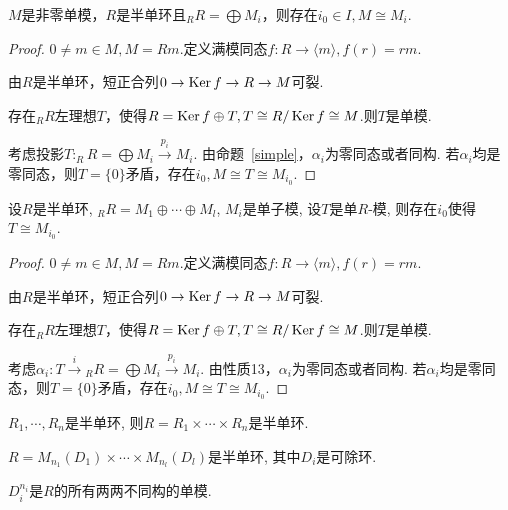 \begin{proposition}
    $M$是非零单模，$ R $是半单环且$_R R=\bigoplus M_i$，则存在$i_0\in I,M\cong M_i$.
\end{proposition}
\begin{proof}
$0\neq m\in M,M=Rm$.定义满模同态$f:R\rightarrow \langle m\rangle,f(r)=rm$.

由$ R $是半单环，短正合列$0\rightarrow \operatorname{Ker} f\rightarrow R\rightarrow M$可裂.

存在$_R R$左理想$T$，使得$R=\operatorname{Ker} f\oplus T,T\cong R/\operatorname{Ker} f\cong M $.则$T$是单模.

考虑投影$T: _RR=\bigoplus M_i \xrightarrow{p_i} M_i$.
由命题~\ref{simple}，$\alpha _i$为零同态或者同构.
若$\alpha _i$均是零同态，则$T=\{0\}$矛盾，存在$i_0,M\cong T\cong M_{i_0}$.
\end{proof}
\begin{corollary}
    设$R$是半单环, $_RR=M_1\oplus \cdots \oplus M_l$, $M_i$是单子模, 
    设$T$是单$R$-模, 则存在$i_0$使得$T\cong M_{i_0}$.
\end{corollary}
\begin{proof}
    $0\neq m\in M,M=Rm$.定义满模同态$f:R\rightarrow \langle m\rangle,f(r)=rm$.

由$ R $是半单环，短正合列$0\rightarrow \operatorname{Ker} f\rightarrow R\rightarrow M$可裂.

存在$_RR$左理想$T$，使得$R=\operatorname{Ker} f\oplus T,T\cong R/\operatorname{Ker} f\cong M $.则$T$是单模.

考虑$\alpha_i:T\xrightarrow{i}{}_RR=\bigoplus M_i \xrightarrow{p_i} M_i$.
由性质13，$\alpha _i$为零同态或者同构.
若$\alpha _i$均是零同态，则$T=\{0\}$矛盾，存在$i_0,M\cong T\cong M_{i_0}$.
\end{proof}

\begin{proposition}
    $R_1,\cdots,R_n$是半单环, 则$R=R_1\times \cdots\times R_n$是半单环.
\end{proposition}

\begin{proposition}
    $R=M_{n_1}(D_1)\times \cdots \times M_{n_l}(D_l)$是半单环, 其中$D_i$是可除环.\par
    \qquad $D_i^{n_i}$是$R$的所有两两不同构的单模.
\end{proposition}

